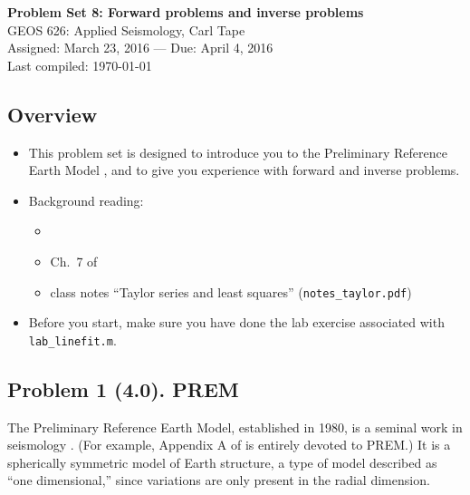 \documentclass[11pt,titlepage,fleqn]{article}
\begin{document}

\begin{spacing}{1.2}
\centering
{\large \bf Problem Set 8: Forward problems and inverse problems} \\
GEOS 626: Applied Seismology, Carl Tape \\
Assigned: March 23, 2016 --- Due: April 4, 2016 \\
Last compiled: \today
\end{spacing}


\subsection*{Overview}

\begin{itemize}
\item This problem set is designed to introduce you to the Preliminary Reference Earth Model \citep{PREM}, and to give you experience with forward and inverse problems.

\item Background reading:
%
\begin{itemize}
\item \citet{PREM}
\item Ch.~7 of \citet{SteinWysession}
\item class notes ``Taylor series and least squares'' (\verb+notes_taylor.pdf+)
\end{itemize}


\item Before you start, make sure you have done the lab exercise associated with \verb+lab_linefit.m+.

\end{itemize}


\subsection*{Problem 1 (4.0). PREM}

The Preliminary Reference Earth Model, established in 1980, is a seminal work in seismology \citep{PREM}. (For example, Appendix A of \citet{ShearerE2} is entirely devoted to PREM.) It is a spherically symmetric model of Earth structure, a type of model described as ``one dimensional,'' since variations are only present in the radial dimension.
\end{document}
